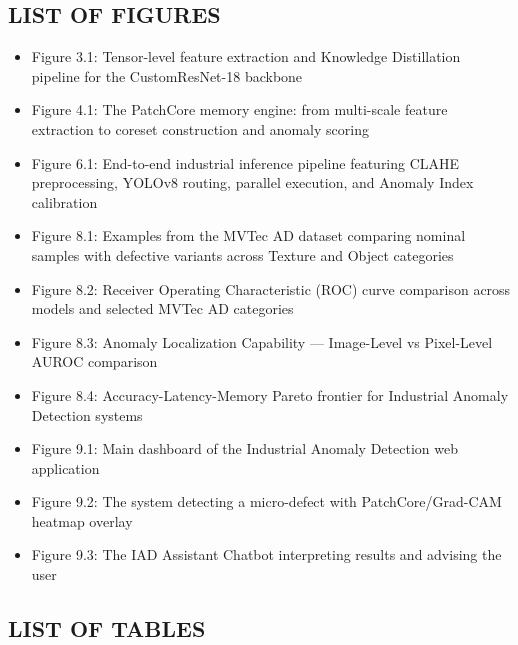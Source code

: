 \subsection{LIST OF FIGURES}\label{list-of-figures}

\begin{itemize}
\tightlist
\item
  Figure 3.1: Tensor-level feature extraction and Knowledge Distillation pipeline for the CustomResNet-18 backbone
\item
  Figure 4.1: The PatchCore memory engine: from multi-scale feature extraction to coreset construction and anomaly scoring
\item
  Figure 6.1: End-to-end industrial inference pipeline featuring CLAHE preprocessing, YOLOv8 routing, parallel execution, and Anomaly Index calibration
\item
  Figure 8.1: Examples from the MVTec AD dataset comparing nominal samples with defective variants across Texture and Object categories
\item
  Figure 8.2: Receiver Operating Characteristic (ROC) curve comparison across models and selected MVTec AD categories
\item
  Figure 8.3: Anomaly Localization Capability --- Image-Level vs Pixel-Level AUROC comparison
\item
  Figure 8.4: Accuracy-Latency-Memory Pareto frontier for Industrial Anomaly Detection systems
\item
  Figure 9.1: Main dashboard of the Industrial Anomaly Detection web application
\item
  Figure 9.2: The system detecting a micro-defect with PatchCore/Grad-CAM heatmap overlay
\item
  Figure 9.3: The IAD Assistant Chatbot interpreting results and advising the user
\end{itemize}

\subsection{LIST OF TABLES}\label{list-of-tables}

